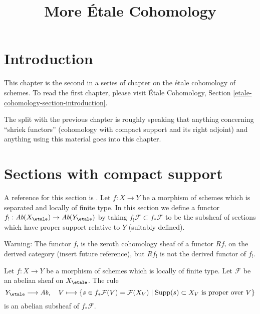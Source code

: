 

%


\title{More \'Etale Cohomology}


\maketitle

\label{section-phantom}

\tableofcontents


\section{Introduction}
\label{section-introduction}

\noindent
This chapter is the second in a series of chapter on the \'etale cohomology
of schemes. To read the first chapter, please visit
\'Etale Cohomology, Section \ref{etale-cohomology-section-introduction}.

\medskip\noindent
The split with the previous chapter is roughly speaking that anything
concerning ``shriek functors'' (cohomology with compact support and
its right adjoint) and anything using this material goes into this chapter.










\section{Sections with compact support}
\label{section-compact-support}

\noindent
A reference for this section is \cite[Exposee XVII, Section 6]{SGA4}.
Let $f : X \to Y$ be a morphism of schemes which is separated and
locally of finite type. In this section we define a functor
$f_! : \textit{Ab}(X_\etale) \to \textit{Ab}(Y_\etale)$
by taking $f_!\mathcal{F} \subset f_*\mathcal{F}$
to be the subsheaf of sections which have proper support relative to $Y$
(suitably defined).

\medskip\noindent
Warning: The functor $f_!$ is the zeroth cohomology sheaf of a functor
$Rf_!$ on the derived category (insert future reference), but
$Rf_!$ is not the derived functor of $f_!$.

\begin{lemma}
\label{lemma-f-shriek-separated}
Let $f : X \to Y$ be a morphism of schemes which is locally of finite type.
Let $\mathcal{F}$ be an abelian sheaf on $X_\etale$. The rule
$$
Y_\etale \longrightarrow \textit{Ab},\quad
V \longmapsto \{s \in f_*\mathcal{F}(V) = \mathcal{F}(X_V) \mid
\text{Supp}(s) \subset X_V \text{ is proper over }V\}
$$
is an abelian subsheaf of $f_*\mathcal{F}$.
\end{lemma}

